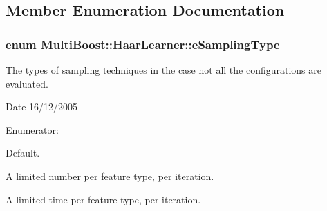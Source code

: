 \subsection{Member Enumeration Documentation}
\hypertarget{classMultiBoost_1_1HaarLearner_adf0e32ac3343991b3bdd302ba8cc0696}{
\subsubsection[{eSamplingType}]{\setlength{\rightskip}{0pt plus 5cm}enum {\bf MultiBoost::HaarLearner::eSamplingType}}}
\label{classMultiBoost_1_1HaarLearner_adf0e32ac3343991b3bdd302ba8cc0696}
The types of sampling techniques in the case not all the configurations are evaluated. \begin{DoxyDate}{Date}
16/12/2005 
\end{DoxyDate}
\begin{Desc}
\item[Enumerator: ]\par
\begin{description}
\item[{\em 
\hypertarget{classMultiBoost_1_1HaarLearner_adf0e32ac3343991b3bdd302ba8cc0696a2a74732a5d05064447d1fdb5cc7409c0}{
ST\_\-NO\_\-SAMPLING}
\label{classMultiBoost_1_1HaarLearner_adf0e32ac3343991b3bdd302ba8cc0696a2a74732a5d05064447d1fdb5cc7409c0}
}]Default. \item[{\em 
\hypertarget{classMultiBoost_1_1HaarLearner_adf0e32ac3343991b3bdd302ba8cc0696ac2c6fa2572b28e92f2102d8588517d55}{
ST\_\-NUM}
\label{classMultiBoost_1_1HaarLearner_adf0e32ac3343991b3bdd302ba8cc0696ac2c6fa2572b28e92f2102d8588517d55}
}]A limited number per feature type, per iteration. \item[{\em 
\hypertarget{classMultiBoost_1_1HaarLearner_adf0e32ac3343991b3bdd302ba8cc0696a46a18d520e35d646bda098f409697fb6}{
ST\_\-TIME}
\label{classMultiBoost_1_1HaarLearner_adf0e32ac3343991b3bdd302ba8cc0696a46a18d520e35d646bda098f409697fb6}
}]A limited time per feature type, per iteration. \end{description}
\end{Desc}



